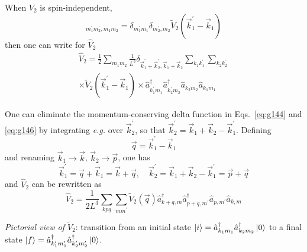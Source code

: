 \documentclass[12pt]{article}
\newcommand{\be}{\begin{equation}}
\newcommand{\ee}{\end{equation}}
\begin{document}
When $V_2$ is spin-independent,
\be
[\widetilde{V}_2(\vec{k}_1^\prime - \vec{k}_1, s)]_{m_1^\prime m_2^\prime, m_1 m_2}
=
\delta_{m_1^\prime m_1}\delta_{m_2^\prime,m_2}
\widetilde{V}_2(\vec{k}_1^\prime - \vec{k}_1)
\ee
then one can write for $\hat{V}_2$
\be
\begin{gathered}
\hat{V}_2 = \frac{1}{2}
\sum_{m_1m_2}
\frac{1}{L^3} \delta_{\vec{k}_1^\prime + \vec{k}_2^\prime, \vec{k}_1+\vec{k}_2}
\sum_{k_1k_1^\prime}\sum_{k_2k_2^\prime}\\
\times
\widetilde{V}_2(\vec{k}_1^\prime - \vec{k}_1)
\times 
\hat{a}_{k_1^\prime m_1}^{\dagger} \hat{a}_{k_2^\prime m_2}^{\dagger} 
\hat{a}_{k_2 m_2} \hat{a}_{k_1 m_1}
\end{gathered}
\label{eq:g146}
\ee

One can eliminate the momentum-conserving delta
function in Eqs.~\eqref{eq:g144} and \eqref{eq:g146} by integrating \textit{e.g.}
over $\vec{k}_{2}^{\prime}$, so that $\vec{k}_{2}^{\prime}=\vec{k}_{1}+\vec{k}_{2}-\vec{k}_{1}^{\prime}$. Defining
\be
\vec{q} = \vec{k}_{1}^{\prime}-\vec{k}_{1}
\ee
and renaming $\vec{k}_{1} \to \vec{k}$, $\vec{k}_{2} \to \vec{p}$, one has
\be
\vec{k}_{1}^{\prime} = \vec{q}+\vec{k}_{1} = 
\vec{k}+\vec{q},\quad
\vec{k}_{2}^{\prime} = \vec{k}_{1}+\vec{k}_{2} - \vec{k}_{1}^{\prime} =
\vec{p}+\vec{q}
\ee
and $\hat{V}_2$ can be rewritten as
\be
\hat{V}_2 = \frac{1}{2L^3}
\sum_{kpq} \sum_{mm^\prime}
\widetilde{V}_2(\vec{q})
\hat{a}^\dagger_{k+q,m} \hat{a}^\dagger_{p+q, m^{\prime}} 
\hat{a}_{p, m^{\prime}} \hat{a}_{k,m}
\ee

\emph{Pictorial view of $\widetilde{V}_2$}: transition from an initial state
$\ket{i} = \hat{a}^\dagger_{k_1m_1}\hat{a}^\dagger_{k_2m_2}\ket{0}$
to a final state
$\ket{f} = \hat{a}^\dagger_{k_1^\prime m_1^\prime }\hat{a}^\dagger_{k_2^\prime m_2^\prime }\ket{0}$.
\end{document}
